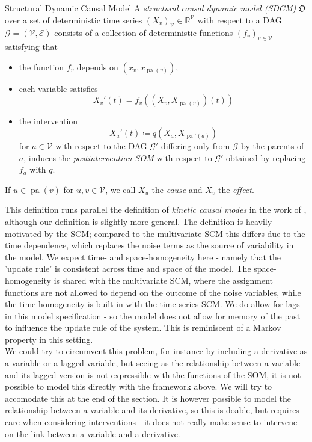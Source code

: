 \documentclass[11pt, a4paper]{memoir}
\theoremstyle{break}
\theoremstyle{break}
\theoremstyle{nonumberplain}
\newcommand{\mR}{\mathbb{R}}
\DeclareMathOperator{\pa}{pa}
\begin{document}
\begin{mydefinition}{Structural Dynamic Causal Model}
A \emph{structural causal dynamic model (SDCM)} $\mathfrak{O}$ over a set of deterministic time series $(X_v)_\mathcal{V}\in \mR^\mathcal{V}$ with respect to a DAG $\mathcal{G}=(\mathcal{V},\mathcal{E})$ consists of a collection of deterministic functions $(f_v)_{v\in \mathcal{V}}$ satisfying that
\begin{itemize}
	\item the function $f_v$ depends on $\left(x_v,x_{\pa(v)} \right)$,
	\item each variable satisfies
	$$ X_v'(t)=f_v\left(\left(X_v,X_{\pa(v)}\right)(t)\right)$$
	\item the intervention 
	$$X_a'
	(t)\coloneqq q\left(X_a,X_{\pa'(a)}\right)$$ 
	for $a\in \mathcal{V}$ with respect to the DAG $\mathcal{G}'$ differing only from $\mathcal{G}$ by the parents of $a$, induces the \emph{postintervention SOM} with respect to $\mathcal{G}'$ obtained by replacing $f_a$ with $q$.
\end{itemize}
If $u\in \pa(v)$ for $u,v\in \mathcal{V}$, we call $X_u$ the \emph{cause} and $X_v$ the \emph{effect}. 
\end{mydefinition}
This definition runs parallel the definition of \emph{kinetic causal modes} in the work of \cite{KCM}, although our definition is slightly more general. The definition is heavily motivated by the SCM; compared to the multivariate SCM this differs due to the time dependence, which replaces the noise terms as the source of variability in the model. We expect time- and space-homogeneity here - namely that the 'update rule' is consistent across time and space of the model. The space-homogeneity is shared with the multivariate SCM, where the assignment functions are not allowed to depend on the outcome of the noise variables, while the time-homogeneity is built-in with the time series SCM. We do allow for lags in this model specification - so the model does not allow for memory of the past to influence the update rule of the system. This is reminiscent of a Markov property in this setting.\\[5pt]
We could try to circumvent this problem, for instance by including a derivative as a variable or a lagged variable, but seeing as the relationship between a variable and its lagged version is not expressible with the functions of the SOM, it is not possible to model this directly with the framework above. We will try to accomodate this at the end of the section. It is however possible to model the relationship between a variable and its derivative, so this is doable, but requires care when considering interventions - it does not really make sense to intervene on the link between a variable and a derivative.\\[5pt]
\end{document}
